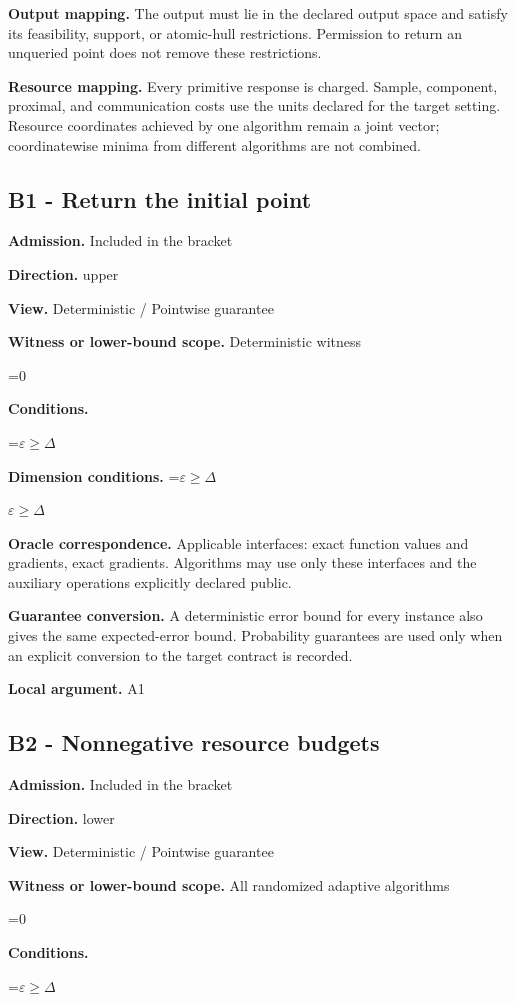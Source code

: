 \documentclass[10pt,a4paper]{article}
\newcommand{\AtlasMath}[1]{\par\begingroup\centering\setbox0=\hbox{$\displaystyle #1$}\ifdim\wd0>1.4\linewidth\typeout{ATLAS WIDE FORMULA: \the\wd0}\fi\ifdim\wd0>\linewidth\resizebox{\linewidth}{!}{\box0}\else\box0\fi\par\endgroup}
\newcommand{\AtlasInlineMath}[1]{\begingroup\setbox0=\hbox{$#1$}\ifdim\wd0>.4\linewidth\endgroup\AtlasMath{#1}\else\endgroup$#1$\fi}
\begin{document}
\textbf{Output mapping.} The output must lie in the declared output space and satisfy its feasibility, support, or atomic-hull restrictions. Permission to return an unqueried point does not remove these restrictions.

\textbf{Resource mapping.} Every primitive response is charged. Sample, component, proximal, and communication costs use the units declared for the target setting. Resource coordinates achieved by one algorithm remain a joint vector; coordinatewise minima from different algorithms are not combined.

\subsection{B1 - Return the initial point}
\textbf{Admission.} Included in the bracket

\textbf{Direction.} upper

\textbf{View.} Deterministic / Pointwise guarantee

\textbf{Witness or lower-bound scope.} Deterministic witness

\AtlasMath{0}
\textbf{Conditions.} 
\AtlasMath{\varepsilon\ge\Delta}


\textbf{Dimension conditions.} \AtlasInlineMath{\varepsilon\ge\Delta}

\textbf{Oracle correspondence.} Applicable interfaces: exact function values and gradients, exact gradients. Algorithms may use only these interfaces and the auxiliary operations explicitly declared public.

\textbf{Guarantee conversion.} A deterministic error bound for every instance also gives the same expected-error bound. Probability guarantees are used only when an explicit conversion to the target contract is recorded.

\textbf{Local argument.} A1

\subsection{B2 - Nonnegative resource budgets}
\textbf{Admission.} Included in the bracket

\textbf{Direction.} lower

\textbf{View.} Deterministic / Pointwise guarantee

\textbf{Witness or lower-bound scope.} All randomized adaptive algorithms

\AtlasMath{0}
\textbf{Conditions.} 
\AtlasMath{\varepsilon\ge\Delta}
\end{document}
